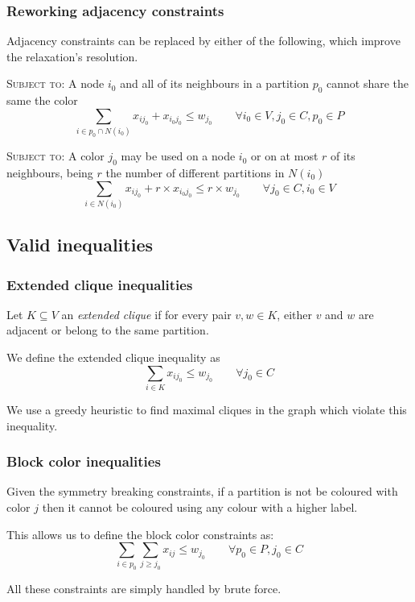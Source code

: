\documentclass{beamer}
\newcommand{\lprestriction}[3]{\textsc{Subject to:} #1 \[ #2 \qquad #3 \]}
\newcommand{\lpineq}[2]{\[ #1 \qquad #2 \]}
\begin{document}
\begin{frame}
\frametitle{Reworking adjacency constraints}

Adjacency constraints can be replaced by either of the following, which improve the relaxation's resolution.

\lprestriction{A node $i_0$ and all of its neighbours in a partition $p_0$ cannot share the same the color}
{\sum_{i \in p_0 \cap N(i_0)} x_{ij_0} + x_{i_0j_0} \leq w_{j_0}}{\forall i_0 \in V, j_0 \in C, p_0 \in P}


\lprestriction{A color $j_0$ may be used on a node $i_0$ or on at most $r$ of its neighbours, being $r$ the number of different partitions in $N(i_0)$}
{\sum_{i \in N(i_0)} x_{ij_0} + r \times x_{i_0j_0} \leq r \times w_{j_0}}{ \forall j_0 \in C, i_0 \in V}

\end{frame} 

\subsection{Valid inequalities}

\begin{frame}
\frametitle{Extended clique inequalities}

Let $K \subseteq V$ an \textit{extended clique} if for every pair $v,w \in K$, either $v$ and $w$ are adjacent or belong to the same partition.

We define the extended clique inequality as
\lpineq{\sum_{i \in K} x_{ij_0} \leq w_{j_0}}{\forall j_0 \in C}

We use a greedy heuristic to find maximal cliques in the graph which violate this inequality.

\end{frame} 

\begin{frame}
\frametitle{Block color inequalities}

Given the symmetry breaking constraints, if a partition is not be coloured with color $j$ then it cannot be coloured using any colour with a higher label.

This allows us to define the block color constraints as:
\lpineq{\sum_{i \in p_0}\sum_{j \geq j_0} x_{ij} \leq w_{j_0}}{\forall p_0 \in P, j_0 \in C}

All these constraints are simply handled by brute force.

\end{frame} 
\end{document}
